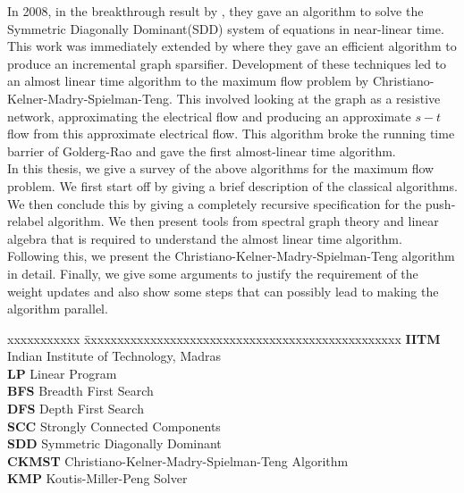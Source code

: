 \documentclass[BTech]{iitmdiss}
\begin{document}
In 2008, in the breakthrough result by \cite{DBLP:journals/corr/abs-0808-4134}, they gave an algorithm to solve the Symmetric Diagonally Dominant(SDD) system of equations in 
near-linear time. This work was immediately extended by \cite{DBLP:journals/corr/abs-1003-2958} where they gave an efficient algorithm to produce an incremental graph sparsifier.
Development of these techniques led to an almost linear time algorithm to the maximum flow problem by Christiano-Kelner-Madry-Spielman-Teng.
This involved looking at the graph as a resistive network, approximating the electrical flow and producing an approximate $s-t$ flow from this approximate
electrical flow. This algorithm broke the running time barrier of Golderg-Rao and gave the first almost-linear time algorithm. \\

In this thesis, we give a survey of the above algorithms for the maximum flow problem. We first start off by giving a brief description of the 
classical algorithms. We then conclude this by giving a completely recursive specification for the push-relabel algorithm.
We then present tools from spectral graph theory and linear algebra that is required to understand the almost linear 
time algorithm. Following this, we present the Christiano-Kelner-Madry-Spielman-Teng algorithm in detail. Finally, we give some arguments to justify the requirement of the weight updates and also show some steps that can possibly
lead to making the algorithm parallel.\\

\pagebreak



\begin{singlespace}
\tableofcontents
\thispagestyle{empty}

\end{singlespace}


\abbreviations
 
\noindent 
\begin{tabbing}
 xxxxxxxxxxx \= xxxxxxxxxxxxxxxxxxxxxxxxxxxxxxxxxxxxxxxxxxxxxxxx \kill
\textbf{IITM}   \> Indian Institute of Technology, Madras \\
 \textbf{LP}  \> Linear Program \\
\textbf{BFS} \> Breadth First Search \\
\textbf{DFS} \> Depth First Search \\
 \textbf{SCC} \> Strongly Connected Components \\
\textbf{SDD} \> Symmetric Diagonally Dominant \\
\textbf{CKMST} \> Christiano-Kelner-Madry-Spielman-Teng Algorithm \\
 \textbf{KMP} \> Koutis-Miller-Peng Solver \\
\end{tabbing}
\end{document}
